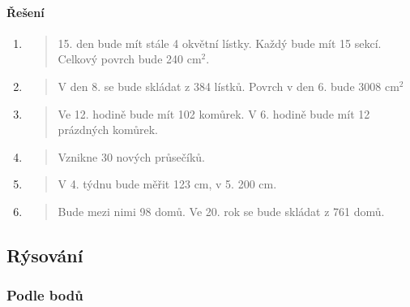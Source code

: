 \newpage

\paragraph{Řešení}
\begin{enumerate}
    \item
    \begin{quote}
        15. den bude mít stále 4 okvětní lístky. Každý bude mít 15 sekcí. Celkový povrch bude 240 cm$^{2}$.
    \end{quote}

    \item
    \begin{quote}
        V den 8. se bude skládat z 384 lístků. Povrch v den 6. bude 3008 cm$^{2}$
    \end{quote}

    \item
    \begin{quote}
        Ve 12. hodině bude mít 102 komůrek. V 6. hodině bude mít 12 prázdných komůrek.
    \end{quote}

    \item
    \begin{quote}
        Vznikne 30 nových průsečíků.
    \end{quote}

    \item
    \begin{quote}
        V 4. týdnu bude měřit 123 cm, v 5. 200 cm.
    \end{quote}

    \item
    \begin{quote}
        Bude mezi nimi 98 domů. Ve 20. rok se bude skládat z 761 domů.
    \end{quote}
\end{enumerate}

\newpage

\subsection{Rýsování}
\label{subsec:rysovani}

\subsubsection{Podle bodů}

